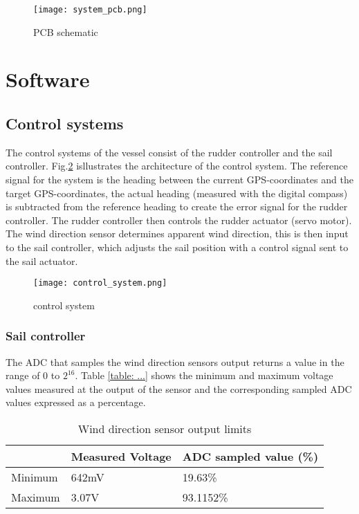 \begin{figure}[!h]
    \centering
    \texttt{[image: system\_pcb.png]}
    \caption[PCB schematic]{PCB schematic}
    \label{fig:pcb}
\end{figure}



\section{Software}

\subsection{Control systems}
The control systems of the vessel consist of the rudder controller and the sail controller. Fig.\ref{fig:control-system} isllustrates the architecture of the control system. The reference signal
for the system is the heading between the current GPS-coordinates and the target GPS-coordinates, the actual heading (measured with the digital compass) is subtracted from the reference heading
to create the error signal for the rudder controller. The rudder controller then controls the rudder actuator (servo motor). 
The wind direction sensor determines apparent wind direction, this 
is then input to the sail controller, which adjusts the sail position with a control signal sent to the sail actuator.

\begin{figure}[!h]
    \centering
    \texttt{[image: control\_system.png]}
    \caption[Control system]{control system}
    \label{fig:control-system}
\end{figure}


\subsubsection{Sail controller}

The ADC that samples the wind direction sensors output returns a value in the range of 0 to $2^{16}$. Table \ref{table: ...} shows the minimum and maximum voltage values measured at the output of 
the sensor and the corresponding sampled ADC values expressed as a percentage. 

\begin{table}[!h]
    \centering
    \caption{Wind direction sensor output limits}
    \label{table:adc-limits}
    \begin{tabularx}{\columnwidth}{ | X | X | X | }
        
        \hline
         &Measured Voltage & ADC sampled value (\%)\\
        \hline
        Minimum & 642mV & 19.63\%  \\
        \hline
        Maximum & 3.07V & 93.1152\%  \\
        \hline
    \end{tabularx}
\end{table}

